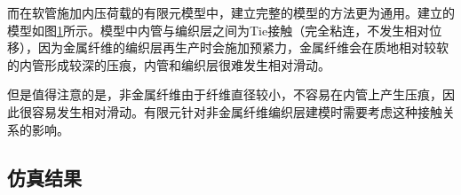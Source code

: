 而在软管施加内压荷载的有限元模型中，建立完整的模型的方法更为通用。建立的模型如图\ref{fig:whole-m-2}所示。模型中内管与编织层之间为Tie接触（完全粘连，不发生相对位移），因为金属纤维的编织层再生产时会施加预紧力，金属纤维会在质地相对较软的内管形成较深的压痕，内管和编织层很难发生相对滑动。

\begin{figure}[!htp]
\centering
{}
\hspace{0.5cm}
\label{fig:whole-m-2}
\end{figure}

但是值得注意的是，非金属纤维由于纤维直径较小，不容易在内管上产生压痕，因此很容易发生相对滑动。有限元针对非金属纤维编织层建模时需要考虑这种接触关系的影响。

\subsection{仿真结果}

